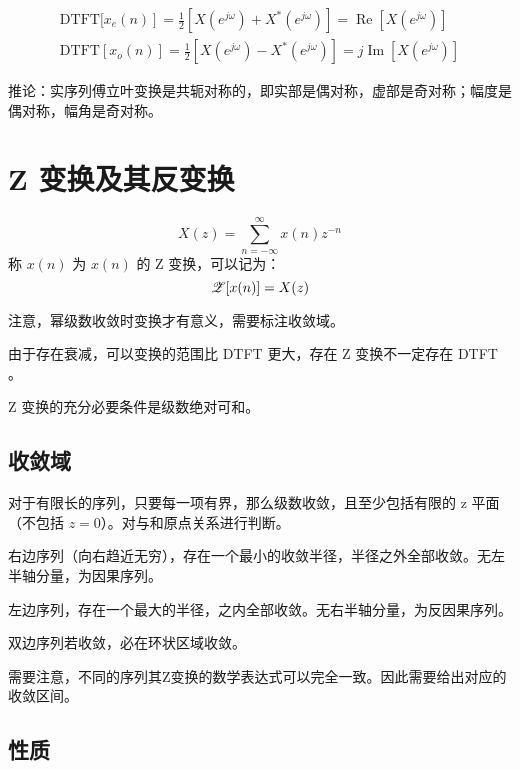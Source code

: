 \documentclass[cn,11pt,chinese,black,simple]{../elegantbook}
\begin{document}
\begin{equation}\begin{array}{l} 
    \text {DTFT[} \left.x_{e}(n)\right]=\frac{1}{2}\left[X\left(e^{j \omega}\right)+X^{*}\left(e^{j \omega}\right)\right]=\operatorname{Re}\left[X\left(e^{j \omega}\right)\right] \\
    \text {DTFT} \left[x_{o}(n)\right]=\frac{1}{2}\left[X\left(e^{j \omega}\right)-X^{*}\left(e^{j \omega}\right)\right]=j \operatorname{Im}\left[X\left(e^{j \omega}\right)\right]
\end{array}\end{equation}

推论：实序列傅立叶变换是共轭对称的，即实部是偶对称，虚部是奇对称；幅度是偶对称，幅角是奇对称。 

\section{Z 变换及其反变换}

\begin{definition}[z 变换]
    \[X(z) = \sum_{n = -\infty}^\infty x(n)z^{-n}\] 
    称 \(x(n)\) 为 \(x(n)\) 的 Z 变换，可以记为：
    \[\mathscr{Z}[x(n)] = X(z)\]

    注意，幂级数收敛时变换才有意义，需要标注收敛域。
\end{definition}

由于存在衰减，可以变换的范围比 DTFT 更大，存在 Z 变换不一定存在 DTFT 。

Z 变换的充分必要条件是级数绝对可和。

\subsection{收敛域}

对于有限长的序列，只要每一项有界，那么级数收敛，且至少包括有限的 z 平面（不包括 \(z = 0\)）。对与和原点关系进行判断。

右边序列（向右趋近无穷），存在一个最小的收敛半径，半径之外全部收敛。无左半轴分量，为因果序列。

左边序列，存在一个最大的半径，之内全部收敛。无右半轴分量，为反因果序列。

双边序列若收敛，必在环状区域收敛。

需要注意，不同的序列其Z变换的数学表达式可以完全一致。因此需要给出对应的收敛区间。

\subsection{性质}
\end{document}
